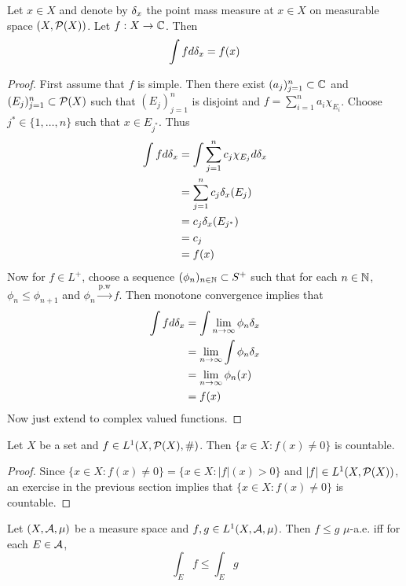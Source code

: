 \documentclass{book}
\begin{document}
	\begin{ex}  
		Let $x \in X$ and denote by $\delta_x$ the point mass measure at $x \in X$ on  measurable space $(X, \mathcal{P}(X))$. Let $f:X \rightarrow \mathbb{C}$. Then $$\int f d \delta_x = f(x)$$  
	\end{ex}
	
	\begin{proof}
		First assume that $f$ is simple. Then there exist $(a_j)_{j=1}^n \subset \mathbb{C}$ and $(E_j)_{j=1}^n \subset \mathcal{P}(X)$ such that $(E_j)_{j=1}^n$ is disjoint and $f = \sum_{i = 1}^n a_i\chi_{E_i}$. Choose $j^* \in \{1, \ldots, n\}$ such that $x \in E_{j^*}$. Thus 
		\begin{align*}
		\int f d\delta_x 
		&= \int \sum_{j=1}^n c_j \chi_{E_j} d \delta_x \\
		&= \sum_{j=1}^n c_j \delta_x(E_j) \\
		&= c_j \delta_x(E_{j^*}) \\
		&= c_j \\
		&= f(x)
		\end{align*} 
		Now for $f \in L^+$, choose a sequence $(\phi_n)_{n \in \mathbb{N}} \subset S^+$ such that for each $n \in \mathbb{N}$, $\phi_n \leq \phi_{n+1}$ and $\phi_n \xrightarrow{\text{p.w}} f$. Then monotone convergence implies that 
		\begin{align*}
		\int f d \delta_x 
		&= \int \lim \limits_{n \rightarrow \infty} \phi_n  \delta_x \\
		&= \lim \limits_{n \rightarrow \infty} \int \phi_n \delta_x \\
		&= \lim \limits_{n \rightarrow \infty} \phi_n(x) \\
		&= f(x) 
		\end{align*}
		Now just extend to complex valued functions.
		
	\end{proof}
	
	\begin{ex}  
		Let $X$ be a set and $f \in L^1(X, \mathcal{P}(X), \#)$. Then $\{x \in X: f(x) \neq 0\}$ is countable.
	\end{ex}
	
	\begin{proof} 
		Since $\{x \in X: f(x) \neq 0\} = \{x \in X: |f|(x) > 0\}$ and $|f| \in L^1(X, \mathcal{P}(X))$, an exercise in the previous section implies that $\{x \in X: f(x) \neq 0\}$ is countable.
	\end{proof}
	
	\begin{ex}  
		Let $(X, \mathcal{A}, \mu)$ be a measure space and $f,g \in L^1(X, \mathcal{A}, \mu)$. Then $f \leq g$ $\mu$-a.e. iff for each $E \in \mathcal{A}$, 
		$$\int_E f \leq \int_E g$$  
	\end{ex}
	
\end{document}
